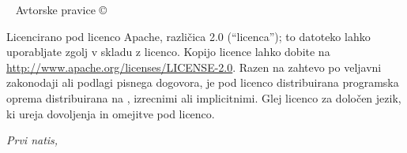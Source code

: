 \newpage
\begin{fullwidth}
~\vfill
\thispagestyle{empty}
\setlength{\parindent}{0pt}
\setlength{\parskip}{\baselineskip}
Avtorske pravice \copyright\ \the\year\ \thanklessauthor

\par{}

\par{}

\par Licencirano pod licenco Apache, različica 2.0 (``licenca''); to datoteko lahko uporabljate zgolj v skladu z licenco. Kopijo licence lahko dobite na \url{http://www.apache.org/licenses/LICENSE-2.0}. Razen na zahtevo po veljavni zakonodaji ali podlagi pisnega dogovora, je pod licenco distribuirana programska oprema distribuirana na , izrecnimi ali implicitnimi. Glej
licenco za določen jezik, ki ureja dovoljenja in omejitve pod licenco.

\par\textit{Prvi natis, \monthyear}
\end{fullwidth}

